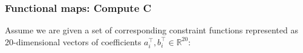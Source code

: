\documentclass[compress]{beamer}
\begin{document}
\begin{frame}[fragile]
\frametitle{Functional maps: Compute C}
Assume we are given a set of corresponding constraint functions represented as 20-dimensional vectors of coefficients $a_i^\top,b_i^\top \in \mathbb{R}^{20}$:
\begin{figure}[htp]
  \begin{center}

\end{center}
\end{figure}
\end{frame}
\end{document}
